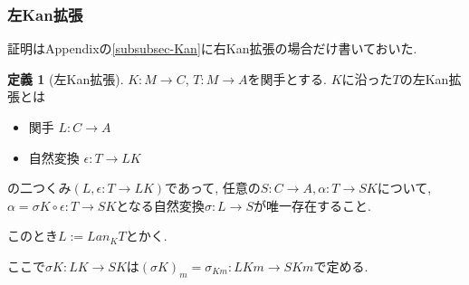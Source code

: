 \documentclass[dvipdfmx,a4paper,11pt]{report}
\theoremstyle{definition}
\newtheorem{dfn}[thm]{定義}
\newtheorem{exa}[thm]{例}
\begin{document}
\begin{comment}


\begin{exa}
$\mathcal{E}={\bf 1}$とする.
$b \in Ob(\mathcal{C})$は
$b :  {\bf 1} \to \mathcal{C}$という関手とみれる. 
$S : \mathcal{D} \to \mathcal{C}$関手として
コンマ圏$(b \downarrow S)$は次のようになる. 
\begin{itemize}
\item Object $(1,d,f) \in Ob(\mathcal{E}) \times Ob(\mathcal{D}) \times Hom_{\mathcal{C}}(b, Sd)$ , つまり$f : b \to Sd$とする. 
\item Morphism $(1,h) : (1,d,f)  \to (1,d',f') \in Hom_{\mathcal{E}}(e,e') \times Hom_{\mathcal{D}}(d,d') $ を $1 : 1 \to 1, h: d \to d'$で$f' = f' \circ id_b = Sh \circ f$となるもの
\end{itemize}

\begin{equation*}
\xymatrix@C=25pt@R=20pt{
1 \ar@{->}[d] _{1}&b\ar@{=}[d]_{id_b}  \ar@{->}[r]^{f} & Sd\ar@{->}[d]^{Sh} &d\ar@{->}[d]_{h}\\
1&b\ar@{->}[r]_{f'} &Sd'&d' \\   
}
\end{equation*}

紛らわしいので１を消すと
\begin{itemize}
\item Object $(d,f) \in \times Ob(\mathcal{D}) \times Hom_{\mathcal{C}}(b, Sd)$ , つまり$f : b \to Sd$とする. 
\item Morphism $h : (d,f)  \to (d',f') \in Hom_{\mathcal{D}}(d,d') $ を 
$h: d \to d'$で$f'  = Sh \circ f$となるもの
\end{itemize}

\end{exa}
\end{comment}


\subsubsection{左Kan拡張}
証明はAppendixの\ref{subsubsec-Kan}に右Kan拡張の場合だけ書いておいた. 

 \begin{tcolorbox}
 [colback = white, colframe = green!35!black, fonttitle = \bfseries,breakable = true]
\begin{dfn}[左Kan拡張]\cite[10.3節]{Mac}\cite[2.1節]{alg}
$K : M \to C$, $T : M \to A$を関手とする.
$K$に沿った$T$の左Kan拡張とは
\begin{itemize}
\item 関手 $L : C \to A$
\item 自然変換 $\epsilon :  T \to LK$
\end{itemize}
の二つくみ$(L, \epsilon :  T \to LK)$であって, 
任意の$S : C \to A, \alpha :  T \to SK $について, $\alpha = \sigma K \circ \epsilon:  T \to SK$となる自然変換$\sigma : L \to S$が唯一存在すること. 

このとき$L := Lan_{K}T$とかく. 
\end{dfn}
\end{tcolorbox}
ここで$\sigma K : LK\to SK$は$(\sigma K)_{m}=\sigma_{Km} : LKm \to SKm$で定める. 
\end{document}
